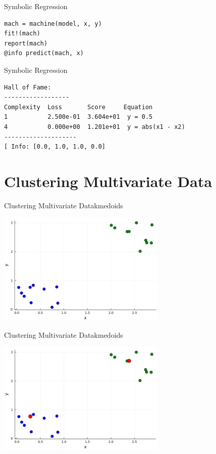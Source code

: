 \documentclass[11pt]{beamer}
\begin{document}
\begin{frame}[fragile]{Symbolic Regression}
\begin{lstlisting}
mach = machine(model, x, y)
fit!(mach)
report(mach)
@info predict(mach, x)
\end{lstlisting}
\end{frame}


\begin{frame}[fragile]{Symbolic Regression}
\begin{lstlisting}
Hall of Fame:   
------------------                                                                                                                                    Complexity  Loss       Score     Equation                                                                                                                1           2.500e-01  3.604e+01  y = 0.5                                                                                                                4           0.000e+00  1.201e+01  y = abs(x1 - x2)
--------------------                                                                                                       
[ Info: [0.0, 1.0, 1.0, 0.0]

\end{lstlisting}
\end{frame}


\section{Clustering Multivariate Data}
\begin{frame}[fragile]{Clustering Multivariate Data}{kmedoids}
	\begin{center}
		\includegraphics[width=8cm]{images/kmedoids1.png}
	\end{center}
\end{frame}

\begin{frame}[fragile]{Clustering Multivariate Data}{kmedoids}
	\begin{center}
		\includegraphics[width=8cm]{images/kmedoids2.png}
	\end{center}
\end{frame}
\end{document}
